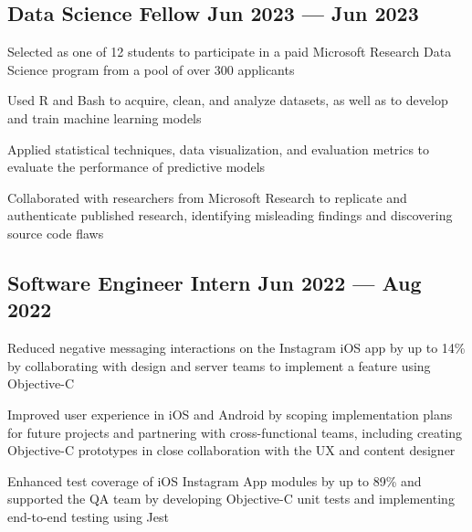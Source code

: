 \subsection{{Data Science Fellow \hfill Jun 2023 --- Jun 2023}}
\begin{zitemize}
\item Selected as one of 12 students to participate in a paid Microsoft Research Data Science program from a pool of over 300 applicants
\item Used R and Bash to acquire, clean, and analyze datasets, as well as to develop and train machine learning models
\item Applied statistical techniques, data visualization, and evaluation metrics to evaluate the performance of predictive models
\item Collaborated with researchers from Microsoft Research to replicate and authenticate published research, identifying misleading findings and discovering source code flaws
\end{zitemize}




\subsection{{Software Engineer Intern \hfill Jun 2022 --- Aug 2022}}
\begin{zitemize}
\item Reduced negative messaging interactions on the Instagram iOS app by up to 14\% by collaborating with design and server teams to implement a feature using Objective-C
\item Improved user experience in iOS and Android by scoping implementation plans for future projects and partnering with cross-functional teams, including creating Objective-C prototypes in close collaboration with the UX and content designer
\item Enhanced test coverage of iOS Instagram App modules by up to 89\% and supported the QA team by developing Objective-C unit tests and implementing end-to-end testing using Jest
\end{zitemize}

